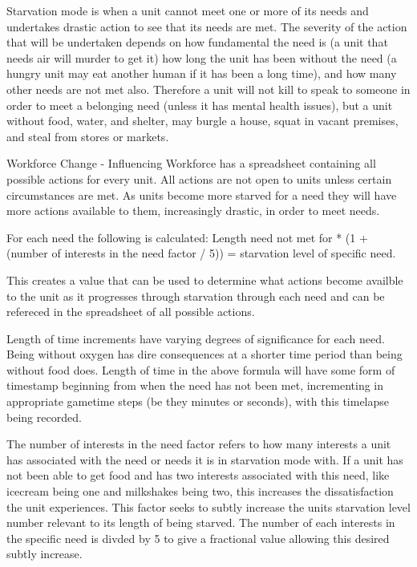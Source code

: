 

Starvation mode is when a unit cannot meet one or more of its needs and undertakes drastic action to see that its needs are met. The severity of the action that will be undertaken depends on how fundamental the need is (a unit that needs air will murder to get it) how long the unit has been without the need (a hungry unit may eat another human if it has been a long time), and how many other needs are not met also. Therefore a unit will not kill to speak to someone in order to meet a belonging need (unless it has mental health issues), but a unit without food, water, and shelter, may burgle a house, squat in vacant premises, and steal from stores or markets.

Workforce Change - Influencing Workforce has a spreadsheet containing all possible actions for every unit. All actions are not open to units unless certain circumstances are met. As units become more starved for a need they will have more actions available to them, increasingly drastic, in order to meet needs. 

For each need the following is calculated:
Length need not met for * (1 + (number of interests in the need factor / 5)) = starvation level of specific need.

This creates a value that can be used to determine what actions become availble to the unit as it progresses through starvation through each need and can be refereced in the spreadsheet of all possible actions.

Length of time increments have varying degrees of significance for each need. Being without oxygen has dire consequences at a shorter time period than being without food does. Length of time in the above formula will have some form of timestamp beginning from when the need has not been met, incrementing in appropriate gametime steps (be they minutes or seconds), with this timelapse being recorded.

The number of interests in the need factor refers to how many interests a unit has associated with the need or needs it is in starvation mode with. If a unit has not been able to get food and has two interests associated with this need, like icecream being one and milkshakes being two, this increases the dissatisfaction the unit experiences. This factor seeks to subtly increase the units starvation level number relevant to its length of being starved. The number of each interests in the specific need is divded by 5 to give a fractional value allowing this desired subtly increase.






